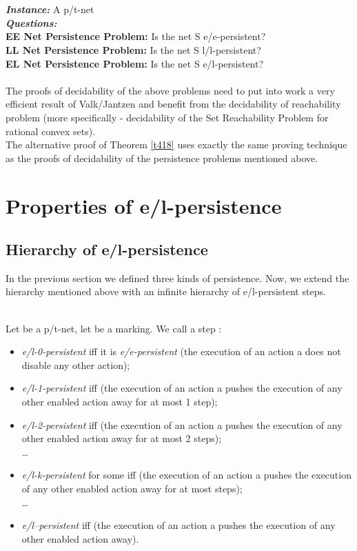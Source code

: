 \documentclass[a4paper]{llncs}
\begin{document}
\\
\\
\textbf{\emph{Instance:}} A p/t-net  \\
\textbf{\emph{Questions:}}\\
\indent\textbf{EE Net Persistence Problem:} Is the net S e/e-persistent?\\
\indent\textbf{LL Net Persistence Problem:} Is the net S l/l-persistent?\\
\indent\textbf{EL Net Persistence Problem:} Is the net S e/l-persistent?\\
\\ 
\newpage
The proofs of decidability of the above problems need to put into work a very efficient result of Valk/Jantzen \cite{ValkJantzen} and benefit from the decidability of reachability problem (more specifically - decidability of the Set Reachability Problem for rational convex sets).
\\
The alternative proof of Theorem \ref{t418} uses exactly the same proving technique as the proofs of decidability of the persistence problems mentioned above.

\section{Properties of e/l-persistence}

\subsection{Hierarchy of e/l-persistence}

In the previous section we defined three kinds of persistence. Now, we extend the hierarchy mentioned above with an infinite hierarchy of e/l-persistent steps.

\begin{definition}
\label{d41}\\
Let  be a p/t-net, let  be a marking.
We call a step :

\begin{itemize}
\item \emph{e/l-0-persistent} iff it is \emph{e/e-persistent} (the execution of an action a does not disable any other action);
\item \emph{e/l-1-persistent} iff  (the execution of an action a pushes the execution of any other enabled action away for at most 1 step);
\item \emph{e/l-2-persistent} iff  (the execution of an action a pushes the execution of any other enabled action away for at most 2 steps);
\\
\indent\ldots

\item \emph{e/l-k-persistent} for some  iff  (the execution of an action a pushes the execution of any other enabled action away for at most  steps);
\\
\indent\ldots
\item \emph{e/l--persistent} iff  (the execution of an action a pushes the execution of any other enabled action away).
\end{itemize}
\end{definition}
\end{document}
